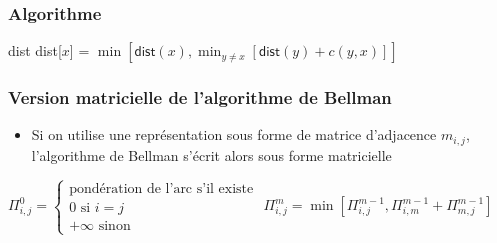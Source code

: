 \begin{frame}[fragile]
    \frametitle{Algorithme}
    \begin{algorithmic}
            \State dist 
                    \State dist[$x$] = $\min [ \mathsf{dist}(x) , \min_{y \neq x} [ \mathsf{dist}(y) + c(y,x)]]$ 
                \EndFor
            \EndFor 
            \EndFunction        
    \end{algorithmic}
\end{frame}






\begin{frame}[fragile]
    \frametitle{Version matricielle de l'algorithme de Bellman}
    \begin{itemize}
        \item Si on utilise une représentation sous forme de matrice d'adjacence $m_{i,j}$, l'algorithme de Bellman s'écrit alors sous forme matricielle 
    \end{itemize}
    \begin{algorithmic}[1]
        \State $\Pi_{i,j}^0 = \left\{ 
            \begin{array}{l}
                \mbox{pondération de l'arc s'il existe} \\
                0\mbox{ si } i=j \\
                +\infty \mbox{ sinon}
            \end{array}
        \right.$
                    \State $\Pi_{i,j}^m = \min \left[\Pi_{i,j}^{m-1}, \Pi_{i,m}^{m-1} + \Pi_{m,j}^{m-1} \right] $
                \EndFor
            \EndFor
        \EndFor
        \EndFunction
    \end{algorithmic}
\end{frame}


